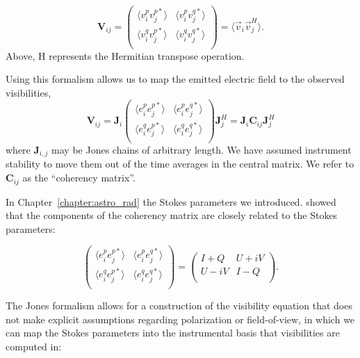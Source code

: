 \begin{equation}
\textbf{V}_{ij} = \begin{pmatrix} 
\langle v^p_i v^{p*}_j \rangle & \langle v^p_i v^{q*}_j \rangle \\
\langle v^q_i v^{p*}_j \rangle & \langle v^q_i v^{q*}_j \rangle \\
 \end{pmatrix} = \langle \vec{v}_i \vec{v}^H_j \rangle.
\end{equation}
Above, H represents the Hermitian transpose operation.

Using this formalism allows us to map the emitted electric field to the observed visibilities, 
\begin{equation}
\textbf{V}_{ij} = \textbf{J}_i \begin{pmatrix} 
\langle e^p_i e^{p*}_j \rangle & \langle e^p_i e^{q*}_j \rangle \\
\langle e^q_i e^{p*}_j \rangle & \langle e^q_i e^{q*}_j \rangle \\
 \end{pmatrix} \textbf{J}^H_j = \textbf{J}_i \textbf{C}_{ij} \textbf{J}^H_j
\end{equation}
where \textbf{J}$_{i,j}$ may be Jones chains of arbitrary length. We have assumed instrument stability to move them out of the time averages in the central matrix. We refer to $\textbf{C}_{ij}$ as the ``coherency matrix''. 

In Chapter~\ref{chapter:astro_rad} the Stokes parameters we introduced. \cite{Hamaker-Bregman.96} showed that the components of the coherency matrix are closely related to the Stokes parameters:

\begin{equation}
\begin{pmatrix} 
\langle e^p_i e^{p*}_j \rangle & \langle e^p_i e^{q*}_j \rangle \\
\langle e^q_i e^{p*}_j \rangle & \langle e^q_i e^{q*}_j \rangle \\
 \end{pmatrix}
 =
 \begin{pmatrix} 
I + Q & U + iV \\
U - iV & I - Q \\
 \end{pmatrix}.
 \label{eq:interferometry-stokes-coherency}
\end{equation}

The Jones formalism allows for a construction of the visibility equation that does not make explicit assumptions regarding polarization or field-of-view, in which we can map the Stokes parameters into the instrumental basis that visibilities are computed in:

